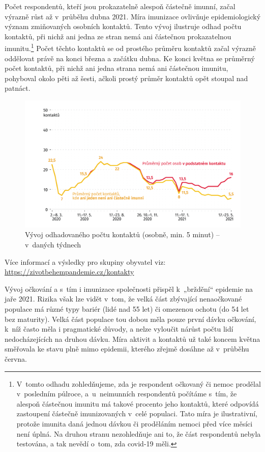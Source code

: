 Počet respondentů, kteří jsou prokazatelně alespoň částečně imunní, začal výrazně růst až v průběhu dubna 2021. Míra imunizace ovlivňuje epidemiologický význam zmiňovaných osobních kontaktů. Tento vývoj ilustruje odhad počtu kontaktů, při nichž ani jedna ze stran nemá ani částečnou prokazatelnou imunitu.\footnote{V tomto odhadu zohledňujeme, zda je respondent očkovaný či nemoc prodělal v~posledním půlroce, a u neimunních respondentů počítáme s tím, že alespoň částečnou imunitu má takové procento jeho kontaktů, které odpovídá zastoupení částečně imunizovaných v celé populaci. Tato míra je ilustrativní, protože imunita daná jednou dávkou či proděláním nemoci před více měsíci není úplná. Na druhou stranu nezohledňuje ani to, že část respondentů nebyla testována, a tak nevědí o~tom, zda covid-19 měli.} Počet těchto kontaktů se od prostého průměru kontaktů začal výrazně oddělovat právě na konci března a začátku dubna. Ke konci května se průměrný počet kontaktů, při nichž ani jedna strana nemá ani částečnou imunitu, pohyboval okolo pěti až šesti, ačkoli prostý průměr kontaktů opět stoupal nad patnáct.

\begin{figure}[ht]
    \centering
    \includegraphics[width=\textwidth]{./pic/zbp-graf7.png}
    \caption{Vývoj odhadovaného počtu kontaktů (osobně, min. 5 minut) – v daných týdnech}
    \label{fig:zbp7}
\end{figure}

Více informací a výsledky pro skupiny obyvatel viz: \url{https://zivotbehempandemie.cz/kontakty}

Vývoj očkování a s tím i imunizace společnosti přispěl k~„brždění“ epidemie na jaře 2021. Rizika však lze vidět v tom, že velká část zbývající nenaočkované populace má různé typy bariér (lidé nad 55 let) či omezenou ochotu (do 54 let bez maturity). Velká část populace tou dobou měla pouze první dávku očkování, k níž často měla i pragmatické důvody, a nelze vyloučit nárůst počtu lidí nedocházejících na druhou dávku. Míra aktivit a kontaktů už také koncem května směřovala ke stavu plně mimo epidemii, kterého zřejmě dosáhne až v průběhu června.

